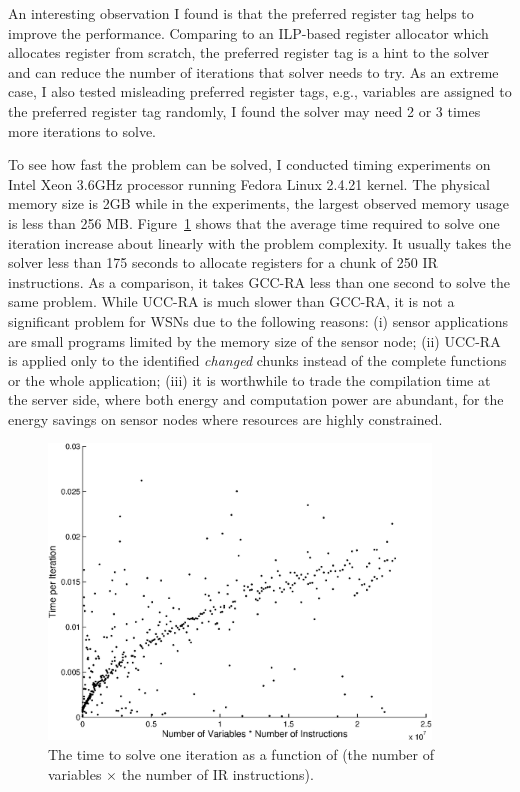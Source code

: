 An interesting observation I found is that the preferred register tag
helps to improve the performance. Comparing to an ILP-based register
allocator which allocates register from scratch, the preferred
register tag is a hint to the solver and can reduce the number of
iterations that solver needs to try.  As an extreme case, I also
tested misleading preferred register tags, e.g., variables are
assigned to the preferred register tag randomly, I found the solver
may need 2 or 3 times more iterations to solve.

To see how fast the problem can be solved, I conducted timing
experiments on Intel Xeon 3.6GHz processor running Fedora Linux 2.4.21
kernel. The physical memory size is 2GB while in the experiments, the
largest observed memory usage is less than 256
MB. Figure~\ref{fexp.time.con} shows that the average time required to
solve one iteration increase about linearly with the problem
complexity.  It usually takes the solver less than 175 seconds to
allocate registers for a chunk of 250 IR instructions. As a
comparison, it takes GCC-RA less than one second to solve the same
problem. While UCC-RA is much slower than GCC-RA, it is not a
significant problem for WSNs due to the following reasons: (i) sensor
applications are small programs limited by the memory size of the
sensor node; (ii) UCC-RA is applied only to the identified {\em
changed} chunks instead of the complete functions or the whole
application; (iii) it is worthwhile to trade the compilation time at
the server side, where both energy and computation power are abundant,
for the energy savings on sensor nodes where resources are highly
constrained.
\begin{figure}[htbp]
\centering
\includegraphics [width=4in]{figures/time_linear.eps}
\caption{The time to solve one iteration as a function of 
(the number of variables $\times$ the number of IR instructions).}
\label{fexp.time.con}
\end{figure}


